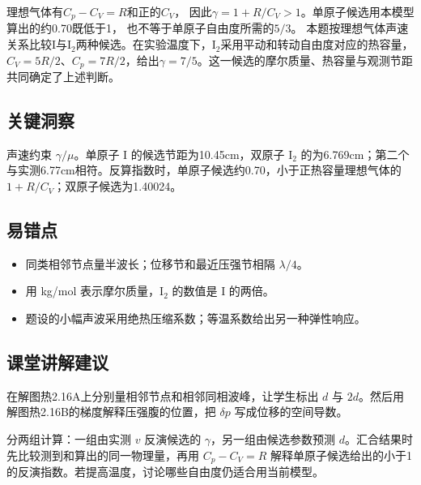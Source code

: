 \documentclass[UTF8,fontset=fandol,a4paper,11pt]{ctexart}
\begin{document}
理想气体有$C_p-C_V=R$和正的$C_V$，
因此$\gamma=1+R/C_V>1$。单原子候选用本模型算出的约0.70既低于1，
也不等于单原子自由度所需的$5/3$。
本题按理想气体声速关系比较I与I$_2$两种候选。在实验温度下，I$_2$采用平动和转动自由度对应的热容量，$C_V=5R/2$、$C_p=7R/2$，给出$\gamma=7/5$。这一候选的摩尔质量、热容量与观测节距共同确定了上述判断。




\subsection*{关键洞察}

声速约束 $\gamma/\mu$。单原子 I 的候选节距为10.45cm，双原子 $\mathrm I_2$ 的为6.769cm；第二个与实测6.77cm相符。反算指数时，单原子候选约0.70，小于正热容量理想气体的 $1+R/C_V$；双原子候选为1.40024。



\subsection*{易错点}

\begin{itemize}
\item 同类相邻节点量半波长；位移节和最近压强节相隔 $\lambda/4$。
\item 用 kg/mol 表示摩尔质量，$\mathrm I_2$ 的数值是 I 的两倍。
\item 题设的小幅声波采用绝热压缩系数；等温系数给出另一种弹性响应。
\end{itemize}



\subsection*{课堂讲解建议}

在解图热2.16A上分别量相邻节点和相邻同相波峰，让学生标出 $d$ 与 $2d$。然后用解图热2.16B的梯度解释压强腹的位置，把 $\delta p$ 写成位移的空间导数。

分两组计算：一组由实测 $v$ 反演候选的 $\gamma$，另一组由候选参数预测 $d$。汇合结果时先比较测到和算出的同一物理量，再用 $C_p-C_V=R$ 解释单原子候选给出的小于1的反演指数。若提高温度，讨论哪些自由度仍适合用当前模型。
\end{document}
